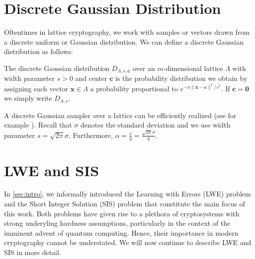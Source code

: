 





\section{Discrete Gaussian Distribution}


Oftentimes in lattice cryptography, we work with samples or vectors drawn from a discrete uniform or Gaussian distribution. We can define a discrete Gaussian distribution as follows:
\begin{definition}
    The discrete Gaussian distribution $D_{\Lambda, s, \mathbf{c}}$ over an $m$-dimensional lattice $\Lambda$ with width parameter $s > 0$ and center $\mathbf{c}$ is the probability distribution we obtain by assigning each vector $\mathbf{x}\in \Lambda$ a probability proportional to $e^{-\pi \|\mathbf{x} - \mathbf{c}\|^2/s^2}$. If $\mathbf{c} = \mathbf{0}$ we simply write  $D_{\Lambda, s}$.
\end{definition}
A discrete Gaussian sampler over a lattice can be efficiently realized (see for example \cite{GPV08}). Recall that $\sigma$ denotes the standard deviation and we use width parameter $s = \sqrt{2 \pi} \sigma$. Furthermore, $\alpha = \frac{s}{q} = \frac{\sqrt{2\pi} \sigma}{q}$.









\section{LWE and SIS}\label{sec:problems}
In \cref{sec:intro}, we informally introduced the Learning with Errors (LWE) problem and the Short Integer Solution (SIS) problem that constitute the main focus of this work. Both problems have given rise to a plethora of cryptosystems with strong underyling hardness assumptions, particularly in the context of the imminent advent of quantum computing. Hence, their importance in modern cryptography cannot be understated. We will now continue to describe LWE and SIS in more detail.

